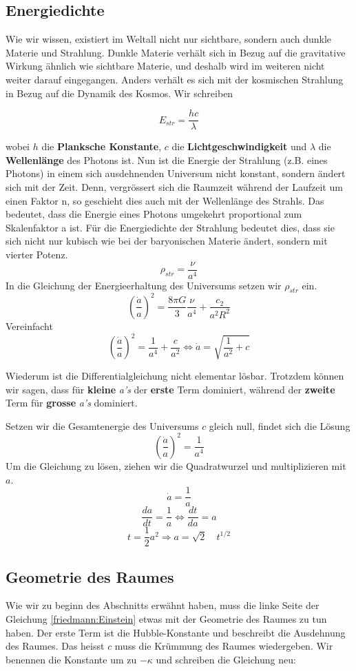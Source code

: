 \begin{refsection}
\subsection{Energiedichte}
Wie wir wissen, existiert im Weltall nicht nur sichtbare, sondern auch dunkle Materie und Strahlung. Dunkle Materie verhält sich in Bezug auf die gravitative Wirkung ähnlich wie sichtbare Materie, und deshalb wird im weiteren nicht weiter darauf eingegangen.
Anders verhält es sich mit der kosmischen Strahlung in Bezug auf die Dynamik des Kosmos. Wir schreiben


\[ E_{str} = \frac{h c}{\lambda} \]

wobei $h$ die \textbf{Planksche Konstante}, $c$ die \textbf{Lichtgeschwindigkeit} und $\lambda$ die \textbf{Wellenlänge} des Photons ist.
Nun ist die Energie der Strahlung (z.B. eines Photons) in einem sich ausdehnenden Universum nicht konstant, sondern ändert sich mit der Zeit. 
Denn, vergrössert sich die Raumzeit während der Laufzeit um einen Faktor n, so geschieht dies auch mit der Wellenlänge des Strahls.
Das bedeutet, dass die Energie eines Photons umgekehrt proportional zum Skalenfaktor a ist. Für die Energiedichte der Strahlung bedeutet dies, dass sie sich nicht nur kubisch wie bei der baryonischen Materie ändert, sondern mit vierter Potenz.
\begin{equation}
\rho_{str} = \frac{\nu}{a^4}
\end{equation}
In die Gleichung der Energieerhaltung des Universums setzen wir $\rho_{str}$ ein.
\[
\left(\frac{\dot{a}}{a} \right)^2 = \frac{8 \pi G}{3} \frac{\nu}{a^4} + \frac{c_2}{a^2 R^2}
\]
Vereinfacht
\[
\left(\frac{\dot{a}}{a} \right)^2 = \frac{1}{a^4} + \frac{c}{a^2} \Leftrightarrow \dot{a} = \sqrt{\frac{1}{a^2} + c}
\]

Wiederum ist die Differentialgleichung nicht elementar lösbar. Trotzdem können wir sagen, dass für \textbf{kleine} \textit{a's} der \textbf{erste} Term dominiert, während der \textbf{zweite} Term für \textbf{grosse} \textit{a's} dominiert.

Setzen wir die Gesamtenergie des Universums $c$ gleich null, findet sich die Lösung	\[\left(\frac{\dot{a}}{a} \right)^2 = \frac{1}{a^4}\]
Um die Gleichung zu lösen, ziehen wir die Quadratwurzel und multiplizieren mit $a$.
\[ \dot{a} = \frac{1}{a} \]
\[\frac{da}{dt} =\frac{1}{a} \Leftrightarrow \frac{dt}{da} = a \]
\[ t = \frac{1}{2} a^{2} \Rightarrow a = \sqrt{2} \quad t^{1/2} \]


\subsection{Geometrie des Raumes}
Wie wir zu beginn des Abschnitts erwähnt haben, muss die  linke Seite der Gleichung \ref{friedmann:Einstein} etwas mit der Geometrie des Raumes zu tun haben.
Der erste Term ist die Hubble-Konstante und beschreibt die Ausdehnung des Raumes. Das heisst
$c$ muss die Krümmung des Raumes wiedergeben.
Wir benennen die Konstante um zu
$-\kappa$ und schreiben die Gleichung neu:



\end{refsection}
